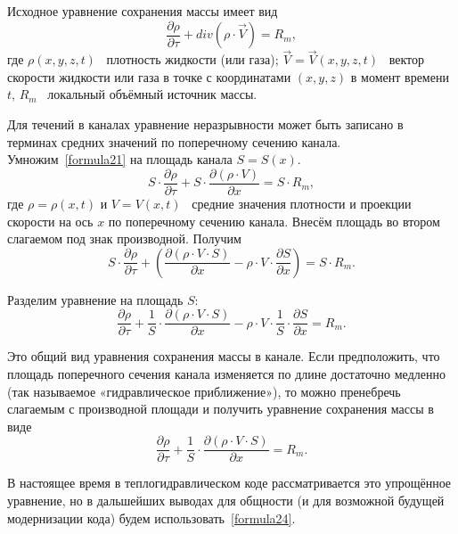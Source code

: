 
\label{sec:subsection21}
Исходное уравнение сохранения массы имеет вид
\begin{equation}
\label{formula21}
\frac{\partial\rho}{\partial\tau}+div\left(\rho\cdot\vec V\right)=R_m,
\end{equation}
где $\rho(x,y,z,t)$ \textthreequartersemdash\ плотность жидкости (или газа); $\vec V=\vec V(x,y,z,t)$ \textthreequartersemdash\ вектор скорости жидкости или газа в точке с координатами $(x,y,z)$ в момент времени $t$, $R_m$ \textthreequartersemdash\ локальный объёмный источник массы.

Для течений в каналах уравнение неразрывности может быть записано в терминах средних значений по поперечному сечению канала. Умножим~\eqref{formula21} на площадь канала $S=S(x)$.
\begin{equation}
\label{formula22}
S\cdot\frac{\partial\rho}{\partial\tau}+S\cdot\frac{\partial(\rho\cdot V)}{\partial x}=S\cdot R_m,
\end{equation}
где $\rho=\rho(x,t)$ и $V=V(x,t)$ \textthreequartersemdash\ средние значения плотности и проекции скорости на ось $x$ по поперечному сечению канала. Внесём площадь во втором слагаемом под знак производной. Получим
\begin{equation}
\label{formula23}
S\cdot\frac{\partial\rho}{\partial\tau}+\left(\frac{\partial(\rho\cdot V\cdot S)}{\partial x}-\rho\cdot V \cdot \frac{\partial S}{\partial x}\right)=S\cdot R_m.
\end{equation}

Разделим уравнение на площадь $S$:
\begin{equation}
\label{formula24}
\frac{\partial\rho}{\partial\tau}+\frac 1 S \cdot \frac{\partial(\rho\cdot V\cdot S)}{\partial x}-\rho\cdot V \cdot \frac 1 S \cdot \frac{\partial S}{\partial x}=R_m.
\end{equation}

Это общий вид уравнения сохранения массы в канале. Если предположить, что площадь поперечного сечения канала изменяется по длине достаточно медленно (так называемое «гидравлическое приближение»), то можно пренебречь слагаемым с производной площади и получить уравнение сохранения массы в виде
\begin{equation}
\label{formula25}
\frac{\partial\rho}{\partial\tau}+\frac 1 S \cdot \frac{\partial(\rho\cdot V\cdot S)}{\partial x}=R_m.
\end{equation}

В настоящее время в теплогидравлическом коде рассматривается это упрощённое уравнение, но в дальшейших выводах для общности (и для возможной будущей модернизации кода) будем использовать~\eqref{formula24}.

